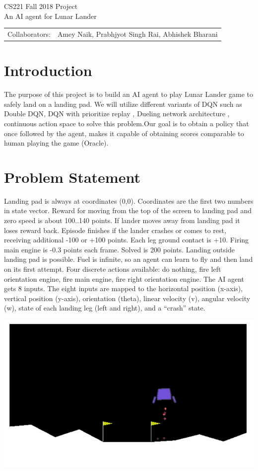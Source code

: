 \documentclass[12pt]{article}
\begin{document}
\begin{center}
{\Large CS221 Fall 2018 Project} \\
{\Large An AI agent for Lunar Lander}

\begin{tabular}{rl}
Collaborators: & Amey Naik, Prabhjyot Singh Rai, Abhishek Bharani
\end{tabular}
\end{center}


\section{Introduction}

The purpose of this project is to build an AI agent to play Lunar Lander game to safely land on a landing pad. We will utilize different variants of DQN such as Double DQN\citep{DoubleQ-learning}, DQN with prioritize replay\citep{PrioritizedReplay} , Dueling network architecture \citep{Dueling}, continuous action space \citep{Continuous} to solve this problem.Our goal is to obtain a policy that once followed by the agent, makes it capable of obtaining scores comparable to human playing  the game  (Oracle).

\section{Problem Statement}
Landing pad is always at coordinates (0,0). Coordinates are the first two numbers in state vector. Reward for moving from the top of the screen to landing pad and zero speed is about 100..140 points. If lander moves away from landing pad it loses reward back. Episode finishes if the lander crashes or comes to rest, receiving additional -100 or +100 points. Each leg ground contact is +10. Firing main engine is -0.3 points each frame. Solved is 200 points. Landing outside landing pad is possible. Fuel is infinite, so an agent can learn to fly and then land on its first attempt. Four discrete actions available: do nothing, fire left orientation engine, fire main engine, fire right orientation engine. The AI agent gets 8 inputs. The eight inputs are mapped to the horizontal position (x-axis), vertical position (y-axis), orientation (theta), linear velocity (v), angular velocity (w), state of each landing leg (left and right), and a “crash” state.
\begin{center}
\includegraphics[scale=0.5]{LunarLanderDemoImage.png}
\end{center}
\end{document}
